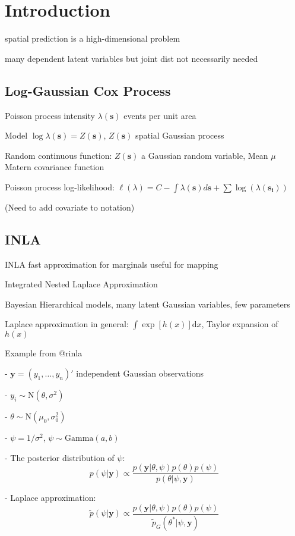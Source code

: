 \documentclass[]{interact}
\begin{document}
\section{Introduction}

spatial prediction is a high-dimensional problem

many dependent latent variables but joint dist not necessarily needed

\subsection{Log-Gaussian Cox Process}

Poisson process intensity $\lambda(\mathbf{s})$ events per unit area

Model $\log\lambda(\mathbf{s}) = Z(\mathbf{s})$, $Z(\mathbf{s})$ spatial Gaussian process

Random continuous function: $Z(\mathbf{s})$ a Gaussian random variable, Mean $\mu$ Matern covariance function

Poisson process log-likelihood: $\ell(\lambda) = C - \int \lambda(\mathbf{s}) d\mathbf{s} + \sum \log(\lambda(\mathbf{s_{i}}))$

(Need to add covariate to notation)

\subsection{INLA}
INLA fast approximation for marginals useful for mapping \cite{rueetal}

Integrated Nested Laplace Approximation

Bayesian Hierarchical models, many latent Gaussian variables, few parameters

Laplace approximation in general: $\int \exp[h(x)]\mathrm{d}x$, Taylor expansion of $h(x)$

Example from @rinla

- $\mathbf{y} = (y_{1}, \dots, y_{n})'$ independent Gaussian observations

- $y_{i} \sim \mathrm{N}(\theta, \sigma^{2})$

- $\theta \sim \mathrm{N}(\mu_{0}, \sigma_{0}^{2})$

- $\psi = 1/\sigma^{2}$, $\psi \sim \mathrm{Gamma}(a, b)$

- The posterior distribution of $\psi$:
$$p(\psi|\mathbf{y}) \propto \frac{p(\mathbf{y} | \theta, \psi) p(\theta) p(\psi)}
{p(\theta | \psi, \mathbf{y})}$$

- Laplace approximation:
$$\tilde{p}(\psi|\mathbf{y}) \propto \frac{p(\mathbf{y} | \theta, \psi) p(\theta) p(\psi)}
{\tilde{p}_{G}(\theta^{*} | \psi, \mathbf{y})}$$
\end{document}
